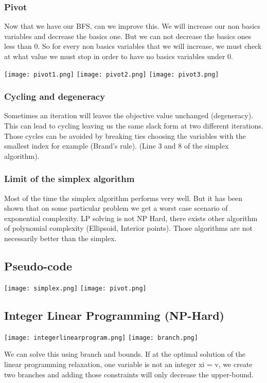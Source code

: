 \subsubsection{Pivot}
Now that we have our BFS, can we improve this. We will increase our non basics variables and decrease the basics one. But we can not decrease the basics ones less than 0. So for every non basics variables that we will increase, we must check at what value we must stop in order to have no basics variables under 0.

\texttt{[image: pivot1.png]}
\texttt{[image: pivot2.png]}
\texttt{[image: pivot3.png]}

\subsubsection{Cycling and degeneracy}
Sometimes an iteration will leaves the objective value unchanged (degeneracy). This can lead to cycling leaving us the same slack form at two different iterations. Those cycles can be avoided by breaking ties choosing the variables with the smallest index for example (Brand's rule). (Line 3 and 8 of the simplex algorithm).

\subsubsection{Limit of the simplex algorithm}
Most of the time the simplex algorithm performs very well. But it has been shown that on some particular problem we get a worst case scenario of exponential complexity. LP solving is not NP Hard, there exists other algorithm of polynomial complexity (Ellipsoid, Interior points). Those algorithms are not necessarily better than the simplex.

\subsection{Pseudo-code}

\texttt{[image: simplex.png]}
\texttt{[image: pivot.png]}

\subsection{Integer Linear Programming (NP-Hard)}

\texttt{[image: integerlinearprogram.png]}
\texttt{[image: branch.png]}

We can solve this using branch and bounds. If at the optimal solution of the linear programming relaxation, one variable is not an integer xi = v, we create two branches and adding those constraints will only decrease the upper-bound.

